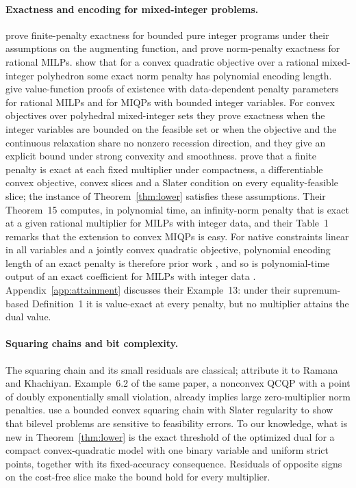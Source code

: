 \paragraph{Exactness and encoding for mixed-integer problems.}
\citet{BolandEberhard2015} prove finite-penalty exactness for bounded
pure integer programs under their assumptions on the augmenting
function, and \citet{FeizollahiAhmedSun2017} prove norm-penalty exactness
for rational MILPs. \citet[Theorem~11]{GuAhmedDey2020} show that for a
convex quadratic objective over a rational mixed-integer polyhedron some
exact norm penalty has polynomial encoding length.
\citet[Theorems~3.1--3.3]{Bhardwaj2024} give value-function proofs of
existence with data-dependent penalty parameters for rational MILPs and
for MIQPs with bounded integer variables. For convex objectives over
polyhedral mixed-integer sets they prove exactness when the integer
variables are bounded on the feasible set or when the objective and the
continuous relaxation share no nonzero recession direction, and they
give an explicit bound under strong convexity and smoothness.
\citet[Theorem~14]{LefebvreSchmidt2025} prove that a finite penalty is
exact at each fixed multiplier under compactness, a differentiable
convex objective, convex slices and a Slater condition on every
equality-feasible slice; the instance of Theorem~\ref{thm:lower}
satisfies these assumptions. Their Theorem~15 computes, in polynomial
time, an infinity-norm penalty that is exact at a given rational
multiplier for MILPs with integer data, and their Table~1 remarks that
the extension to convex MIQPs is easy. For native constraints linear in
all variables and a jointly convex quadratic objective, polynomial
encoding length of an exact penalty is therefore prior work
\citep[Theorem~11]{GuAhmedDey2020}, and so is polynomial-time output of
an exact coefficient for MILPs with integer data
\citep[Theorem~15]{LefebvreSchmidt2025}. Appendix~\ref{app:attainment}
discusses their Example~13: under their supremum-based Definition~1 it
is value-exact at every penalty, but no multiplier attains the dual
value.

\paragraph{Squaring chains and bit complexity.}
The squaring chain and its small residuals are classical;
\citet[Example~6.1]{Bienstock2022} attribute it to Ramana and Khachiyan.
Example~6.2 of the same paper, a nonconvex QCQP with a point of doubly
exponentially small violation, already implies large zero-multiplier
norm penalties. \citet[Sections~2 and~4, Result~4]{Beck2023} use a
bounded convex squaring chain with Slater regularity to show that bilevel
problems are sensitive to feasibility errors. To our knowledge, what is
new in Theorem~\ref{thm:lower} is the exact threshold of the optimized dual for
a compact convex-quadratic model with one binary variable and uniform
strict points, together with its fixed-accuracy consequence. Residuals
of opposite signs on the cost-free slice make the bound hold for every
multiplier.

